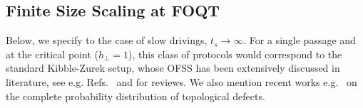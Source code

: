 \subsection{Finite Size Scaling at FOQT}
\label{sec:OFSS-theory}

Below, we specify to the case of slow drivings, $t_s\to\infty$. For a single passage and at the critical point ($h_\perp=1$), this class of protocols would correspond to the standard Kibble-Zurek setup, whose OFSS has been extensively discussed in literature, see e.g. Refs.~\cite{dziarmaga2005dynamics,polkovnikov2005universal,zurek2005dynamics,collura2010critical,liu2020kibble,cui2020experimentally,mukherjee2020universal,zeng2023universal,dutta2016anti,sadhukhan2020sonic,ulm2013observation,weiler2008spontaneous,pyka2013symmetry,navon2016emergence} and \cite{dziarmaga2010dynamics,rossini2021coherent} for reviews. We also mention recent works e.g.~\cite{delcampo2020full,bando2020probing,gomez2022role} on the complete probability distribution of topological defects. 
\\

